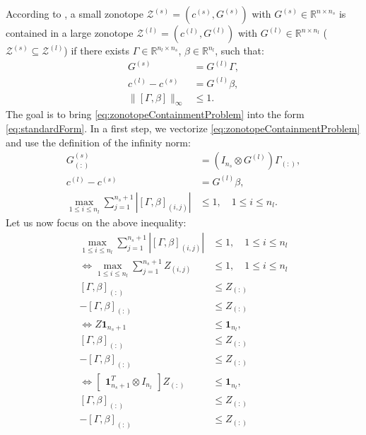 \documentclass[10pt,a4paper]{article}
\renewcommand{\^}[1]{^{(#1)}}
\begin{document}
According to \cite[Corollary 4]{Sadraddini2019}, a small zonotope $\mathcal{Z}\^s = (c\^s, G\^s)$ with $G\^s \in \mathbb{R}^{n \times n_s}$ is contained in a large zonotope $\mathcal{Z}\^l = (c\^l, G\^l)$ with $G\^l \in \mathbb{R}^{n \times n_l}$ ($\mathcal{Z}\^s \subseteq \mathcal{Z}\^l$) if there exists $\Gamma \in \mathbb{R}^{n_l \times n_s}$, $\beta \in \mathbb{R}^{n_l}$, such that:
\begin{equation} \label{eq:zonotopeContainmentProblem}
\begin{split}
  G\^s &= G\^l \Gamma, \\
  c\^l -  c\^s &= G\^l \beta, \\
  \|[\Gamma, \beta]\|_\infty &\leq 1.
\end{split}
\end{equation}
The goal is to bring \eqref{eq:zonotopeContainmentProblem} into the form \eqref{eq:standardForm}. In a first step, we vectorize \eqref{eq:zonotopeContainmentProblem} and use the definition of the infinity norm:
\begin{equation} \label{eq:vectorizedZonotopeContainmentProblem}
\begin{split}
  G\^s_{(:)} &= (I_{n_s} \otimes G\^l) \Gamma_{(:)}, \\
  c\^l -  c\^s &= G\^l \beta, \\
  \max_{1 \leq i \leq n_l} \sum_{j=1}^{n_s + 1} |[\Gamma, \beta]_{(i,j)}| &\leq 1, \quad 1 \leq i \leq n_l.
\end{split}
\end{equation}
Let us now focus on the above inequality:
\begin{equation} \label{eq:equivalenceInequality}
 \begin{split}
  \max_{1 \leq i \leq n_l} \sum_{j=1}^{n_s + 1} |[\Gamma, \beta]_{(i,j)}| & \leq 1, \quad 1 \leq i \leq n_l \\
  \Leftrightarrow \max_{1 \leq i \leq n_l} \sum_{j=1}^{n_s + 1} Z_{(i,j)} & \leq 1, \quad 1 \leq i \leq n_l \\
  [\Gamma, \beta]_{(:)} & \leq Z_{(:)} \\
  -[\Gamma, \beta]_{(:)} & \leq Z_{(:)} \\
  \Leftrightarrow Z \mathbf{1}_{n_s+1} & \leq \mathbf{1}_{n_l}, \\
  [\Gamma, \beta]_{(:)} & \leq Z_{(:)} \\
  -[\Gamma, \beta]_{(:)} & \leq Z_{(:)} \\
  \Leftrightarrow \begin{bmatrix} \mathbf{1}_{n_s+1}^T \otimes I_{n_l} \end{bmatrix} Z_{(:)} & \leq \mathbf{1}_{n_l}, \\
  [\Gamma, \beta]_{(:)} & \leq Z_{(:)} \\
  -[\Gamma, \beta]_{(:)} & \leq Z_{(:)} 
 \end{split}
\end{equation}
\end{document}
